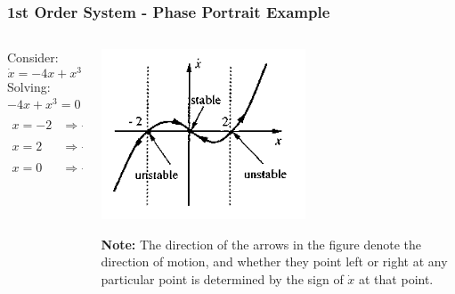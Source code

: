 \documentclass[11pt,handout]{beamer}   %
\begin{document}
\begin{frame}
\frametitle{1st Order System - Phase Portrait Example}
\begin{columns}
\begin{column}{0.5\textwidth}
Consider:
\begin{equation*}
\dot{x} = -4x+x^3
\end{equation*}
Solving: $-4x+x^3 = 0$
\begin{equation*}
\begin{aligned}
x=-2 &\Rightarrow -4(-2) + (-2)^3 = 0\\
x=2 &\Rightarrow  -4(2) + (2)^3 = 0\\
x=0 &\Rightarrow -4(0) + 0^3 = 0
\end{aligned}
\end{equation*}
\end{column}
\begin{column}{0.5\textwidth}
\begin{centering}
\includegraphics[width=\textwidth]{Figures/Example_3.PNG}
\end{centering}
\textbf{Note:} The direction of the arrows in the figure denote the direction of motion, and whether they point left or right at any particular point is determined by the sign of $\dot{x}$ at that point.
\end{column}
\end{columns}
\end{frame}
\end{document}
